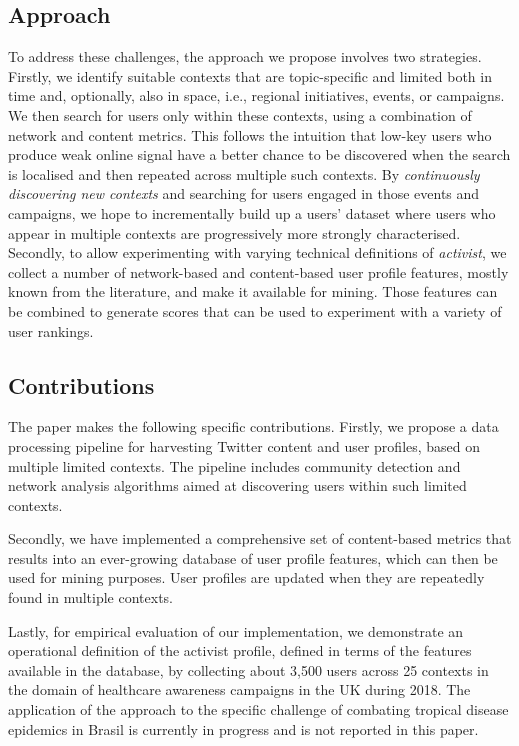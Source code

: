 \subsection{Approach}

To address these challenges, the approach we propose involves two strategies. 
Firstly, we identify suitable contexts that are topic-specific and limited both in time and, optionally, also in space, i.e., regional initiatives, events, or campaigns.
We then search for users only within these contexts, using a combination of network and content metrics. 
This follows the intuition that low-key users who produce weak online signal have a better chance to be discovered when the search is localised and then repeated across multiple such contexts.
By \textit{continuously discovering new contexts} and searching for users engaged in those events and campaigns, we hope to incrementally build up a users' dataset where users who appear in multiple contexts are progressively more strongly characterised.
%
Secondly, to allow experimenting with varying technical definitions of \textit{activist}, we collect a number of network-based and content-based user profile features, mostly known from the literature, and make it available for mining. Those features can be combined to generate scores that can be used to experiment with a variety of user rankings.

\subsection{ Contributions}
The paper makes the following specific contributions.
%
Firstly, we propose a data processing pipeline for harvesting Twitter content and user profiles, based on multiple limited contexts. 
The pipeline includes community detection and network analysis algorithms aimed at discovering users within such limited contexts.

Secondly, we have implemented a comprehensive set of content-based metrics that results into an ever-growing database of user profile features, which can then be used for mining purposes. 
User profiles are updated when they are repeatedly found in multiple contexts.

Lastly, for empirical evaluation of our implementation, we demonstrate an operational definition of the activist profile, defined in terms of the features available in the database, by collecting about 3,500 users  across 25 contexts in the domain of healthcare awareness campaigns in the UK during 2018. 
The application of the approach to the specific challenge of combating tropical disease epidemics in Brasil is currently in progress and is not reported in this paper.

